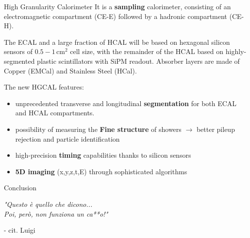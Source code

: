 \documentclass[10pt]{beamer}
\begin{document}
\begin{frame}{High Granularity Calorimeter}
    It is a \textbf{sampling} calorimeter, consisting of an electromagnetic compartment (CE-E) followed by a hadronic compartment (CE-H).
    
    The ECAL and a large fraction of HCAL will be based on hexagonal silicon sensors of $0.5 - 1\,\text{cm}^2$ cell size, with the remainder of the HCAL based on highly-segmented plastic scintillators with SiPM readout.
    Absorber layers are made of Copper (EMCal) and Stainless Steel (HCal).

    The new HGCAL features:
    \begin{itemize}
        \item unprecedented transverse and longitudinal \textbf{segmentation} for both ECAL and HCAL compartments. 
        \item possibility of measuring the \textbf{Fine structure} of showers $\rightarrow$ better pileup rejection and particle identification
        \item high-precision \textbf{timing} capabilities thanks to silicon sensors
        \item \textbf{5D imaging} (x,y,z,t,E) through sophisticated algorithms 
    \end{itemize}{}
\end{frame}

\begin{frame}{Conclusion}
    \begin{flushright}
        \emph{"Questo è quello che dicono... \\Poi, però, non funziona un ca**o!"}
        
        - cit. Luigi
    \end{flushright}
    \
\end{frame}
 
\end{document}
